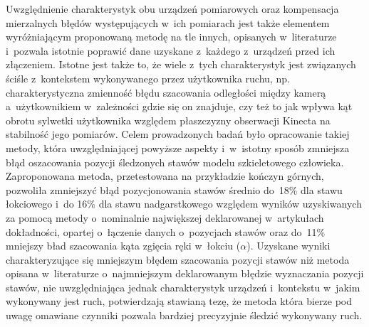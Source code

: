 Uwzględnienie charakterystyk obu urządzeń pomiarowych oraz kompensacja mierzalnych błędów występujących w~ich pomiarach jest także elementem wyróżniającym proponowaną metodę na tle innych, opisanych w~literaturze i~pozwala istotnie poprawić dane uzyskane z~każdego z~urządzeń przed ich złączeniem. Istotne jest także to, że wiele z~tych charakterystyk jest związanych ściśle z~kontekstem wykonywanego przez użytkownika ruchu, np. charakterystyczna zmienność błędu szacowania odległości między kamerą a~użytkownikiem w~zależności gdzie się on znajduje, czy też to jak wpływa kąt obrotu sylwetki użytkownika względem płaszczyzny obserwacji Kinecta na stabilność jego pomiarów. Celem prowadzonych badań było opracowanie takiej metody, która uwzględniającej powyższe aspekty i~w~istotny sposób zmniejsza błąd oszacowania pozycji śledzonych stawów modelu szkieletowego człowieka. Zaproponowana metoda, przetestowana na przykładzie kończyn górnych, pozwoliła zmniejszyć błąd pozycjonowania stawów średnio do~18\% dla stawu łokciowego i~do 16\% dla stawu nadgarstkowego względem wyników uzyskiwanych za pomocą metody o~nominalnie największej deklarowanej w~artykułach dokładności, opartej o~łączenie danych o~pozycjach stawów oraz do~11\% mniejszy bład szacowania kąta zgięcia ręki w~łokciu ($\alpha$). Uzyskane wyniki charakteryzujące się mniejszym błędem szacowania pozycji stawów niż metoda opisana w~literaturze o~najmniejszym deklarowanym błędzie wyznaczania pozycji stawów, nie uwzględniająca jednak charakterystyk urządzeń i~kontekstu w~jakim wykonywany jest ruch, potwierdzają stawianą tezę, że metoda która bierze pod uwagę omawiane czynniki pozwala bardziej precyzyjnie śledzić wykonywany ruch.\\

